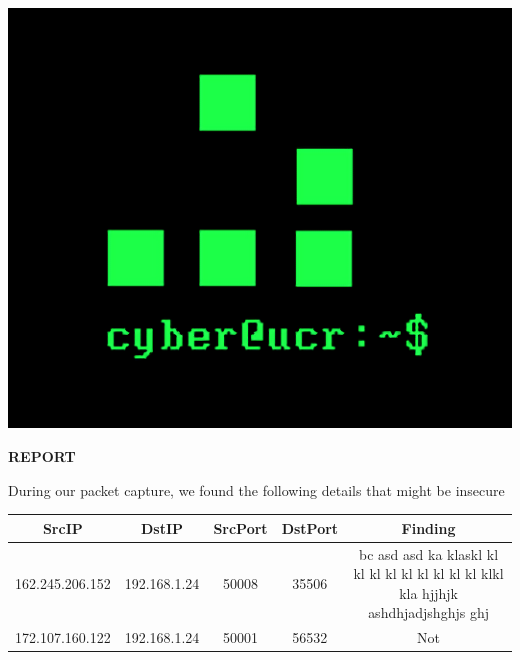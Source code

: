 \documentclass{article}
\begin{document}
\begin{center}
	\includegraphics[scale=0.25]{Cyber_525x438.png}\\
\end{center}	
\centerline{\large \bf REPORT}
\begin{center}
During our packet capture, we found the following details that might be insecure\\
 \begin{tabular}{||c c c c c||} 
 \hline 
 SrcIP & DstIP & SrcPort & DstPort & Finding \\ [0.5ex] 
 \hline\hline
162.245.206.152 & 192.168.1.24 & 50008 & 35506 & \multicolumn{1}{m{3cm}|}{bc asd asd ka klaskl kl kl kl kl kl kl kl kl kl klkl  kla hjjhjk ashdhjadjshghjs ghj}\\
\hline
172.107.160.122 & 192.168.1.24 & 50001 & 56532 & \multicolumn{1}{m{3cm}|}{Not
}\\
\hline
\end{tabular}
\end{center}
\end{document}
